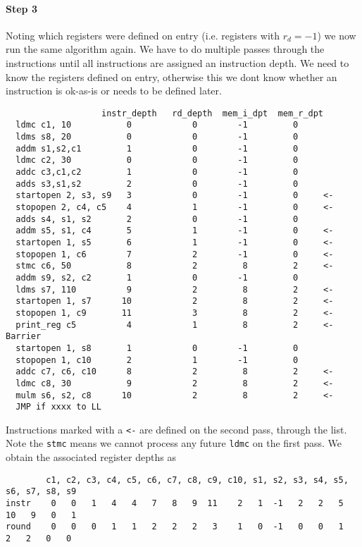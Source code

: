\paragraph{Step 3}
Noting which registers were defined on entry (i.e. registers
with $r_d=-1$) we now run the same algorithm again.
We have to do multiple passes through the instructions until all
instructions are assigned an instruction depth. We need
to know the registers defined on entry, otherwise this
we dont know whether an instruction is ok-as-is or needs
to be defined later.
\begin{verbatim}
                   instr_depth   rd_depth  mem_i_dpt  mem_r_dpt
  ldmc c1, 10           0            0        -1         0
  ldms s8, 20           0            0        -1         0
  addm s1,s2,c1         1            0        -1         0
  ldmc c2, 30           0            0        -1         0
  addc c3,c1,c2         1            0        -1         0
  adds s3,s1,s2         2            0        -1         0
  startopen 2, s3, s9   3            0        -1         0     <-
  stopopen 2, c4, c5    4            1        -1         0     <-
  adds s4, s1, s2       2            0        -1         0
  addm s5, s1, c4       5            1        -1         0     <-
  startopen 1, s5       6            1        -1         0     <-
  stopopen 1, c6        7            2        -1         0     <-
  stmc c6, 50           8            2         8         2     <-
  addm s9, s2, c2       1            0        -1         0
  ldms s7, 110          9            2         8         2     <-
  startopen 1, s7      10            2         8         2     <-
  stopopen 1, c9       11            3         8         2     <-
  print_reg c5          4            1         8         2     <- Barrier
  startopen 1, s8       1            0        -1         0
  stopopen 1, c10       2            1        -1         0
  addc c7, c6, c10      8            2         8         2     <-
  ldmc c8, 30           9            2         8         2     <-
  mulm s6, s2, c8      10            2         8         2     <-
  JMP if xxxx to LL
\end{verbatim}
Instructions marked with a \verb+<-+ are defined on the second pass,
through the list. Note the \verb+stmc+ means we cannot process any future
\verb+ldmc+ on the first pass.
We obtain the associated register depths as
\begin{verbatim}
        c1, c2, c3, c4, c5, c6, c7, c8, c9, c10, s1, s2, s3, s4, s5, s6, s7, s8, s9
instr    0   0   1   4   4   7   8   9  11    2   1  -1   2   2   5  10   9   0   1
round    0   0   0   1   1   2   2   2   3    1   0  -1   0   0   1   2   2   0   0
\end{verbatim}


